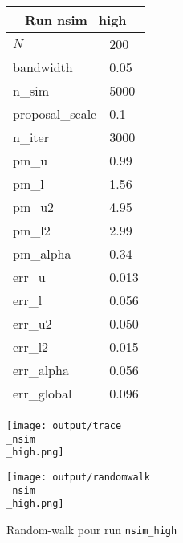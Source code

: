 
\begin{figure}[H]
  \centering
  \begin{minipage}[t]{0.45\textwidth}
    \vspace{0pt}
    \footnotesize
    \begin{tabular}{|l|l|}\hline
    \multicolumn{2}{|c|}{\textbf{Run nsim\_high}} \\ \hline
    $N$ & 200 \\ \hline
    bandwidth & 0.05 \\ \hline
    n\_sim & 5000 \\ \hline
    proposal\_scale & 0.1 \\ \hline
    n\_iter & 3000 \\ \hline
    pm\_u & 0.99 \\ \hline
    pm\_l & 1.56 \\ \hline
    pm\_u2 & 4.95 \\ \hline
    pm\_l2 & 2.99 \\ \hline
    pm\_alpha & 0.34 \\ \hline
    err\_u & 0.013 \\ \hline
    err\_l & 0.056 \\ \hline
    err\_u2 & 0.050 \\ \hline
    err\_l2 & 0.015 \\ \hline
    err\_alpha & 0.056 \\ \hline
    err\_global & 0.096 \\ \hline
    \end{tabular}
  \end{minipage}
  \hfill
  \begin{minipage}[t]{0.45\textwidth}
    \vspace{0pt}
    \texttt{[image: output/trace\\\_nsim\\\_high.png]}
  \end{minipage}
\end{figure}

\begin{figure}[H]
  \centering
  \texttt{[image: output/randomwalk\\\_nsim\\\_high.png]}
  \caption{Random-walk pour run \texttt{nsim\_high}}
\end{figure}

